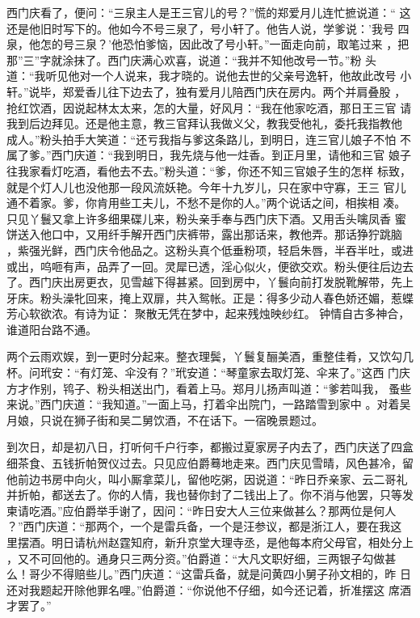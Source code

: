 西门庆看了，便问：“三泉主人是王三官儿的号？”慌的郑爱月儿连忙摭说道：“
这还是他旧时写下的。他如今不号三泉了，号小轩了。他告人说，学爹说：'我号
四泉，他怎的号三泉？'他恐怕爹恼，因此改了号小轩。”一面走向前，取笔过来
，把那”三”字就涂抹了。西门庆满心欢喜，说道：“我并不知他改号一节。”粉
头道：“我听见他对一个人说来，我才晓的。说他去世的父亲号逸轩，他故此改号
小轩。”说毕，郑爱香儿往下边去了，独有爱月儿陪西门庆在房内。两个并肩叠股
，抢红饮酒，因说起林太太来，怎的大量，好风月：“我在他家吃酒，那日王三官
请我到后边拜见。还是他主意，教三官拜认我做义父，教我受他礼，委托我指教他
成人。”粉头拍手大笑道：“还亏我指与爹这条路儿，到明日，连三官儿娘子不怕
不属了爹。”西门庆道：“我到明日，我先烧与他一炷香。到正月里，请他和三官
娘子往我家看灯吃酒，看他去不去。”粉头道：“爹，你还不知三官娘子生的怎样
标致，就是个灯人儿也没他那一段风流妖艳。今年十九岁儿，只在家中守寡，王三
官儿通不着家。爹，你肯用些工夫儿，不愁不是你的人。”两个说话之间，相挨相
凑。只见丫鬟又拿上许多细果碟儿来，粉头亲手奉与西门庆下酒。又用舌头噙凤香
蜜饼送入他口中，又用纤手解开西门庆裤带，露出那话来，教他弄。那话狰狞跳脑
，紫强光鲜，西门庆令他品之。这粉头真个低垂粉项，轻启朱唇，半吞半吐，或进
或出，呜咂有声，品弄了一回。灵犀已透，淫心似火，便欲交欢。粉头便往后边去
了。西门庆出房更衣，见雪越下得甚紧。回到房中，丫鬟向前打发脱靴解带，先上
牙床。粉头澡牝回来，掩上双扉，共入鸳帐。正是：得多少动人春色娇还媚，惹蝶
芳心软欲浓。有诗为证：
聚散无凭在梦中，起来残烛映纱红。
钟情自古多神合，谁道阳台路不通。

两个云雨欢娱，到一更时分起来。整衣理鬓，丫鬟复酾美酒，重整佳肴，又饮勾几
杯。问玳安：“有灯笼、伞没有？”玳安道：“琴童家去取灯笼、伞来了。”这西
门庆方才作别，鸨子、粉头相送出门，看着上马。郑月儿扬声叫道：“爹若叫我，
蚤些来说。”西门庆道：“我知道。”一面上马，打着伞出院门，一路踏雪到家中
。对着吴月娘，只说在狮子街和吴二舅饮酒，不在话下。一宿晚景题过。

到次日，却是初八日，打听何千户行李，都搬过夏家房子内去了，西门庆送了四盒
细茶食、五钱折帕贺仪过去。只见应伯爵蓦地走来。西门庆见雪晴，风色甚冷，留
他前边书房中向火，叫小厮拿菜儿，留他吃粥，因说道：“昨日乔亲家、云二哥礼
并折帕，都送去了。你的人情，我也替你封了二钱出上了。你不消与他罢，只等发
柬请吃酒。”应伯爵举手谢了，因问：“昨日安大人三位来做甚么？那两位是何人
？”西门庆道：“那两个，一个是雷兵备，一个是汪参议，都是浙江人，要在我这
里摆酒。明日请杭州赵霆知府，新升京堂大理寺丞，是他每本府父母官，相处分上
，又不可回他的。通身只三两分资。”伯爵道：“大凡文职好细，三两银子勾做甚
么！哥少不得赔些儿。”西门庆道：“这雷兵备，就是问黄四小舅子孙文相的，昨
日还对我题起开除他罪名哩。”伯爵道：“你说他不仔细，如今还记着，折准摆这
席酒才罢了。”

